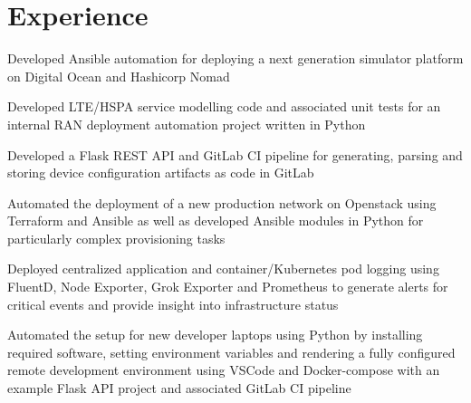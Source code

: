 \documentclass[letterpaper]{deedy-resume} %
\begin{document}
\begin{minipage}[t]{0.66\textwidth} %


\section{Experience}

\vspace{\topsep}
\begin{tightitemize}
\item Developed Ansible automation for deploying a next generation simulator platform on Digital Ocean and Hashicorp Nomad
\end{tightitemize}


\begin{tightitemize}
\item Developed LTE/HSPA service modelling code and associated unit tests for an internal RAN deployment automation project written in Python 
\item Developed a Flask REST API and GitLab CI pipeline for generating, parsing and storing device configuration artifacts as code in GitLab
\item Automated the deployment of a new production network on Openstack using Terraform and Ansible as well as developed Ansible modules in Python for particularly complex provisioning tasks
\item Deployed centralized application and container/Kubernetes pod logging using FluentD, Node Exporter, Grok Exporter and Prometheus to generate alerts for critical events and provide insight into infrastructure status
\item Automated the setup for new developer laptops using Python by installing required software, setting environment variables and rendering a fully configured remote development environment using VSCode and Docker-compose with an example Flask API project and associated GitLab CI pipeline
\end{tightitemize}

\sectionspace %


\end{minipage}
\end{document}
